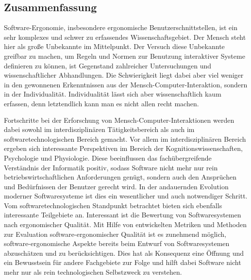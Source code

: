 \subsection{Zusammenfassung}

Software-Ergonomie, insbesondere ergonomische Benutzerschnittstellen, ist ein sehr komplexes und schwer zu erfassendes Wissenschaftsgebiet. Der Mensch steht hier als große Unbekannte im Mittelpunkt. Der Versuch diese Unbekannte greifbar zu machen, um Regeln und Normen zur Benutzung interaktiver Systeme definieren zu können, ist Gegenstand zahlreicher Untersuchungen und wissenschaftlicher Abhandlungen.  Die Schwierigkeit liegt dabei aber viel weniger in den gewonnenen Erkenntnissen aus der Mensch-Computer-Interaktion, sondern in der Individualität. Individualität lässt sich aber wissenschaftlich kaum erfassen, denn letztendlich kann man es nicht allen recht machen.

Fortschritte bei der Erforschung von Mensch-Computer-Interaktionen werden dabei sowohl im interdisziplinären Tätigkeitsbereich als auch im softwaretechnologischen Bereich gemacht. Vor allem im interdisziplinären Bereich ergeben sich interessante Perspektiven im Bereich der Kognitionswissenschaften, Psychologie und Physiologie. Diese beeinflussen das fachübergreifende Verständnis der Informatik positiv, sodass Software nicht mehr nur rein betriebswirtschaftlichen Anforderungen genügt, sondern auch den Ansprüchen und Bedürfnissen der Benutzer gerecht wird. In der andauernden Evolution moderner Softwaresysteme ist dies ein wesentlicher und auch notwendiger Schritt.
Vom softwaretechnologischen Standpunkt betrachtet bieten sich ebenfalls interessante Teilgebiete an. Interessant ist die Bewertung von Softwaresystemen nach ergonomischer Qualität. Mit Hilfe von entwickelten Metriken und Methoden zur Evaluation software-ergonomischer Qualität ist es zunehmend möglich, software-ergonomische Aspekte bereits beim Entwurf von Softwaresystemen abzuschätzen und zu berücksichtigen.
Dies hat als Konsequenz eine Öffnung und ein Bewusstsein für andere Fachgebiete zur Folge und hilft dabei Software nicht mehr nur als rein technologischen Selbstzweck zu verstehen.
